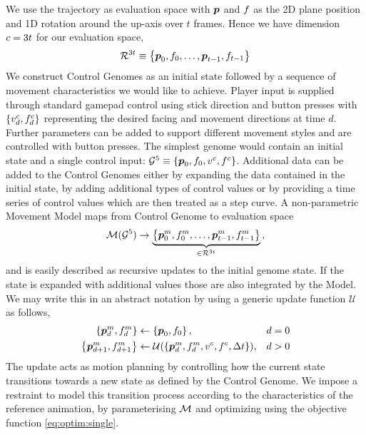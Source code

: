 We use the trajectory as evaluation space with $\boldsymbol{p }$ and $f$ as the 2D plane position and 1D rotation around the up-axis over $t$ frames. Hence we have dimension $c = 3 t$ for our evaluation space,
\begin{align}
\mathcal{R}^{3 t} 
\equiv 
\left\{
    \boldsymbol{p }_0,f_0,
    \ldots,
    \boldsymbol{p }_{t-1},f_{t-1}
    \right\}
\end{align}
We construct Control Genomes as an initial state followed by a sequence of movement characteristics we would like to achieve. Player input is supplied through standard gamepad control using stick direction and button presses with $\left\{ v^c_d, f^c_d \right\}$ representing the desired facing and movement directions at time $d$. Further parameters can be added to support different movement styles and are controlled with button presses. The simplest genome would contain an initial state and a single control input: $\mathcal{G}^5 \equiv \left\{ \boldsymbol{p }_0,f_0,v^c,f^c \right\}$. Additional data can be added to the Control Genomes either by expanding the data contained in the initial state, by adding additional types of control values or by providing a time series of control values which are then treated as a step curve. A non-parametric Movement Model maps from Control Genome to evaluation space
\begin{equation}
    \mathcal{M}(\mathcal{G}^5)
    \rightarrow
    \underbrace{
    \left\{
    \boldsymbol{p }_0^m,f_0^m,\ldots,\boldsymbol{p }_{t-1}^m,f_{t-1}^m\right\}
    }_{\in \mathcal{R}^{3t}}
    \,,
\end{equation}
and is easily described as recursive updates to the initial genome state. If the state is expanded with additional values those are also integrated by the Model. 
We may write this in an abstract notation by using a generic update function $\mathcal{U}$ as follows,
\begin{subequations}
\begin{align}
    \left\{
    \boldsymbol{p }_d^m,f_d^m
    \right\}
    &\leftarrow
    \left\{
    \boldsymbol{p }_0,f_0    
    \right\},&d=0
    \\
    \left\{
    \boldsymbol{p }_{d+1}^m,f_{d+1}^m
    \right\}
    &\leftarrow
    \mathcal{U}
    (
    \left\{
    \boldsymbol{p }_d^m,f_d^m,
    v^c,
    f^c,
    \Delta{t}
    \right\}
    )
    \label{eq:move:update},&d>0
\end{align}
\end{subequations}
The update acts as motion planning by controlling how the current state transitions towards a new state as defined by the Control Genome. We impose a restraint to model this transition process according to the characteristics of the reference animation, by parameterising $\mathcal{M}$ and optimizing using the objective function \eqref{eq:optim:single}. 

